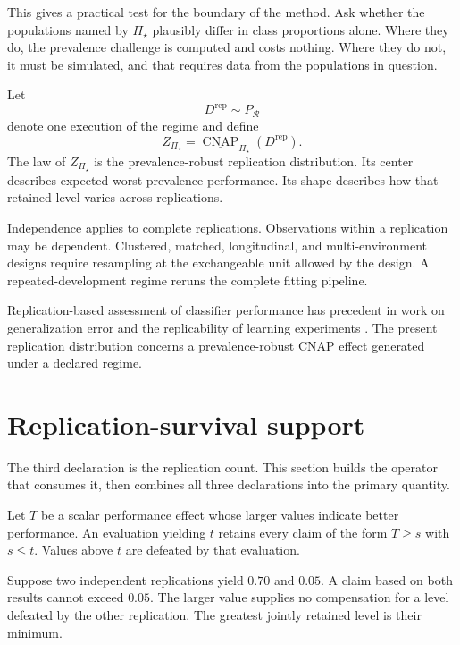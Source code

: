 \documentclass[11pt]{article}
\newcommand{\CNAP}{\operatorname{CNAP}}
\newcommand{\Regime}{\mathcal{R}}
\newcommand{\PSet}{\Pi_\star}
\newcommand{\RobCNAP}{\underline{\CNAP}_{\PSet}}
\theoremstyle{remark}
\begin{document}
This gives a practical test for the boundary of the method. Ask whether the populations named by $\PSet$ plausibly differ in class proportions alone. Where they do, the prevalence challenge is computed and costs nothing. Where they do not, it must be simulated, and that requires data from the populations in question.

Let
\[
D^{\mathrm{rep}}\sim P_{\Regime}
\]
denote one execution of the regime and define
\begin{equation}
Z_{\PSet}
=
\RobCNAP(D^{\mathrm{rep}}).
\label{eq:robust-replication-effect}
\end{equation}
The law of $Z_{\PSet}$ is the prevalence-robust replication distribution. Its center describes expected worst-prevalence performance. Its shape describes how that retained level varies across replications.

Independence applies to complete replications. Observations within a replication may be dependent. Clustered, matched, longitudinal, and multi-environment designs require resampling at the exchangeable unit allowed by the design. A repeated-development regime reruns the complete fitting pipeline.

Replication-based assessment of classifier performance has precedent in work on generalization error and the replicability of learning experiments \cite{nadeau2003inference,bouckaert2004estimating}. The present replication distribution concerns a prevalence-robust CNAP effect generated under a declared regime.

\section{Replication-survival support}
\label{sec:support}

The third declaration is the replication count. This section builds the operator that consumes it, then combines all three declarations into the primary quantity.

Let $T$ be a scalar performance effect whose larger values indicate better performance. An evaluation yielding $t$ retains every claim of the form $T\geq s$ with $s\leq t$. Values above $t$ are defeated by that evaluation.

Suppose two independent replications yield $0.70$ and $0.05$. A claim based on both results cannot exceed $0.05$. The larger value supplies no compensation for a level defeated by the other replication. The greatest jointly retained level is their minimum.
\end{document}
